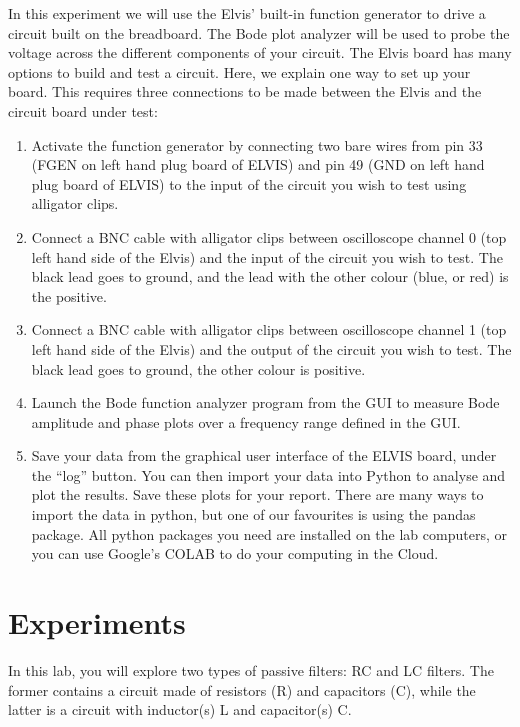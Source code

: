 \documentclass{article}
\begin{document}
In this experiment we will use the Elvis' built-in function generator
to drive a circuit built on the breadboard. The Bode plot analyzer
will be used to probe the voltage across the different components of
your circuit. The Elvis board has many options to build and test a
circuit. Here, we explain one way to set up your board. This requires
three connections to be made between the Elvis and the circuit board
under test:
\begin{enumerate}[resume]
\item Activate the function generator by connecting two bare wires
  from pin 33 (FGEN on left hand plug board of ELVIS) and pin 49 (GND
  on left hand plug board of ELVIS) to the input of the circuit you
  wish to test using alligator clips.
\item Connect a BNC cable with alligator clips between oscilloscope
  channel 0 (top left hand side of the Elvis) and the input of the
  circuit you wish to test. The black lead goes to ground, and the
  lead with the other colour (blue, or red) is the positive.
\item Connect a BNC cable with alligator clips between
  oscilloscope channel 1 (top left hand side of the Elvis) and the
  output of the circuit you wish to test. The black lead goes to
  ground, the other colour is positive.
\item Launch the Bode function analyzer program from the GUI to
  measure Bode amplitude and phase plots over a frequency
  range defined in the GUI.
\item Save your data from the graphical user interface of the ELVIS
  board, under the ``log'' button. You can then import your data into
  Python to analyse and plot the results. Save these plots for your
  report. There are many ways to import the data in python, but one of
  our favourites is using the pandas package. All python packages you
  need are installed on the lab computers, or you can use Google's
  COLAB to do your computing in the Cloud.
\end{enumerate}
\section*{Experiments}
In this lab, you will explore two types of passive filters: RC and LC
filters. The former contains a circuit made of resistors (R) and
capacitors (C), while the latter is a circuit with inductor(s) L and
capacitor(s) C.
\end{document}
